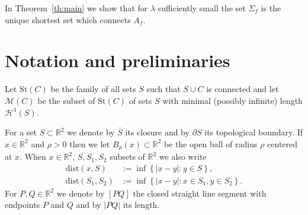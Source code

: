\documentclass{amsart}
\newcommand{\RR}{\mathbb R}
\newcommand{\CC}{\mathbb C}
\newcommand{\NN}{\mathbb N}
\renewcommand{\H}{\mathcal H}
\newcommand{\abs}[1]{\left\vert #1 \right\vert}
\newcommand{\ENCLOSE}[1]{\left\{#1\right\}}
\newcommand{\St}{\mathrm{St}}
\newcommand{\M}{\mathcal{M}}
\renewcommand{\H}{\mathcal{H}}
\newcommand{\dist}{\mathrm{dist}}
\theoremstyle{definition}
\theoremstyle{remark}
\begin{document}
In Theorem~\ref{th:main} we show that for $\lambda$ sufficiently small the set $\Sigma_f$ 
is the unique shortest set which connects $A_f$.


% 
\section{Notation and preliminaries}

Let $\St(C)$ be the family of all sets $S$ such that 
$S\cup C$ is connected and 
let $\M(C)$ be the subset of $\St(C)$ of sets $S$ 
with minimal (possibly infinite) length $\H^1(S)$.

For a set $S\subset \RR^2$ we denote by $\bar S$ 
its closure and by $\partial S$ its topological boundary.
If $x\in \RR^2$ and $\rho>0$ then we let $B_\rho(x)\subset \RR^2$ 
be the open ball of radius 
$\rho$ centered at $x$.
When $x\in \RR^2$, $S,S_1,S_2$ subsets of $\RR^2$
we also write
\begin{align*}
  \dist(x,S)
    &:=\inf\ENCLOSE{\abs{x-y}:y\in S},\\
  \dist(S_1,S_2) 
    &:= \inf\ENCLOSE{\abs{x-y}\colon x\in S_1, y\in S_2}.
\end{align*}
For $P,Q\in \RR^2$ we denote by $[PQ]$ the closed straight line 
segment with endpoints $P$ and $Q$ and by $\abs{PQ}$ its length.
\end{document}
